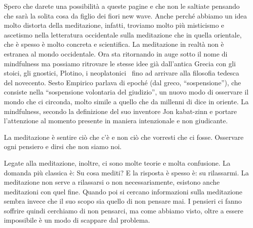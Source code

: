 \documentclass[12pt]{book} %
\begin{document}
Spero che darete una possibilità a queste pagine e che non le saltiate pensando che sarà la solita cosa da figlio dei
fiori new wave. Anche perché abbiamo un idea molto distorta della meditazione, infatti, troviamo molto più misticismo e
ascetismo nella letteratura occidentale sulla meditazione che in quella orientale, che è spesso è molto concreta e
scientifica. La meditazione in realtà non è estranea al mondo occidentale. Ora sta ritornando in auge sotto il nome di
mindfulness ma possiamo ritrovare le stesse idee già dall'antica Grecia con gli stoici, gli
gnostici, Plotino, i neoplatonici \ fino ad arrivare alla filosofia tedesca del novecento. Sesto Empirico parlava di
epoché (dal greco, “sospensione”), che consiste nella “sospensione volontaria del giudizio”, un nuovo modo di osservare
il mondo che ci circonda, molto simile a quello che da millenni di dice in oriente. La mindfulness, secondo la
definizione del suo inventore Jon kabat-zinn e portare l'attenzione al momento presente in maniera intenzionale e non
giudicante.


\bigskip

La meditazione è sentire ciò che c'è e non ciò che vorresti che ci fosse. Osservare ogni pensiero e dirsi che non siamo
noi.


\bigskip

Legate alla meditazione, inoltre, ci sono molte teorie e molta confusione. La domanda più classica è: Su cosa mediti? E
la risposta è spesso è: su rilassarmi. La meditazione non serve a rilassarsi o non necessariamente, esistono anche
meditazioni con quel fine. Quando poi si cercano informazioni sulla meditazione sembra invece che il suo scopo sia
quello di non pensare mai. I pensieri ci fanno soffrire quindi cerchiamo di non pensarci, ma come abbiamo visto, oltre
a essere impossibile è un modo di scappare dal problema.
\end{document}
